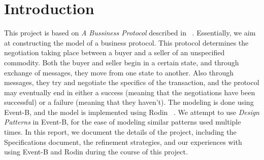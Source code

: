 \section{Introduction}
This project is based on \emph{A Bussiness Protocol} described in ~\cite{AbrialBook}. Essentially, we aim at constructing the model of a business protocol. This protocol determines the negotiation taking place between a buyer and a seller of an unspecified commodity. Both the buyer and seller begin in a certain state, and through exchange of messages, they move from one state to another. Also through messages, they try and negotiate the specifics of the transaction, and the protocol may eventually end in either a success (meaning that the negotiations have been successful)  or a failure (meaning that they haven't). The modeling is done using Event-B, and the model is implemented using Rodin ~\cite{AbrialBHHMV10}. We attempt to use \emph{Design Patterns} in Event-B, for the ease of modeling similar patterns used multiple times. In this report, we document the details of the project, including the Specifications document, the refinement strategies, and our experiences with using Event-B and Rodin during the course of this project.
